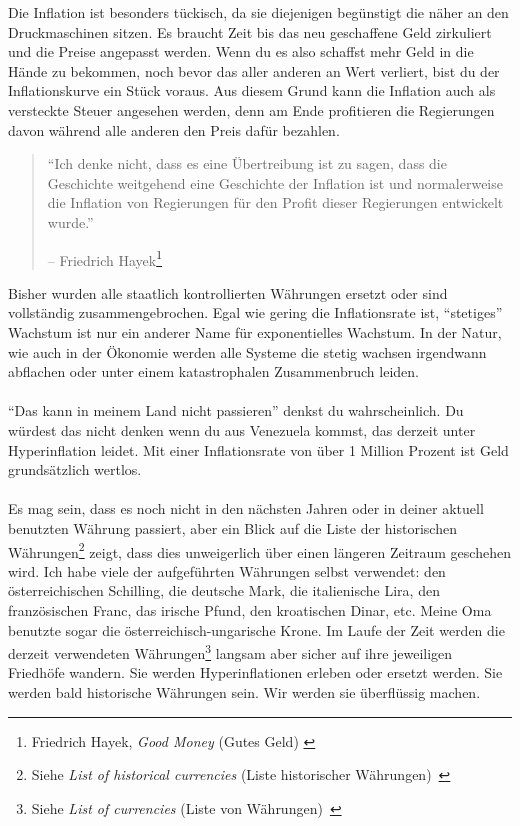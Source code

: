 Die Inflation ist besonders tückisch, da sie diejenigen begünstigt die näher an
den Druckmaschinen sitzen. Es braucht Zeit bis das neu geschaffene Geld
zirkuliert und die Preise angepasst werden. Wenn du es also schaffst mehr Geld
in die Hände zu bekommen, noch bevor das aller anderen an Wert verliert, bist du
der Inflationskurve ein Stück voraus. Aus diesem Grund kann die Inflation auch
als versteckte Steuer angesehen werden, denn am Ende profitieren die Regierungen
davon während alle anderen den Preis dafür bezahlen.

\begin{quotation}\begin{samepage}
\enquote{Ich denke nicht, dass es eine Übertreibung ist zu sagen, dass die
Geschichte weitgehend eine Geschichte der Inflation ist und normalerweise die
Inflation von Regierungen für den Profit dieser Regierungen entwickelt wurde.}
\begin{flushright} -- Friedrich Hayek\footnote{Friedrich Hayek, \textit{Good
Money} (Gutes Geld) \cite{hayek-good-money}}
\end{flushright}\end{samepage}\end{quotation}

Bisher wurden alle staatlich kontrollierten Währungen ersetzt oder sind
vollständig zusammengebrochen. Egal wie gering die Inflationsrate ist,
\enquote{stetiges} Wachstum ist nur ein anderer Name für exponentielles
Wachstum. In der Natur, wie auch in der Ökonomie werden alle Systeme die stetig
wachsen irgendwann abflachen oder unter einem katastrophalen Zusammenbruch
leiden.

\paragraph{}
\enquote{Das kann in meinem Land nicht passieren} denkst du wahrscheinlich. Du
würdest das nicht denken wenn du aus Venezuela kommst, das derzeit unter
Hyperinflation leidet. Mit einer Inflationsrate von über 1 Million Prozent ist
Geld grundsätzlich wertlos. \cite{wiki:venezuela}

\paragraph{}
Es mag sein, dass es noch nicht in den nächsten Jahren oder in deiner aktuell
benutzten Währung passiert, aber ein Blick auf die Liste der historischen
Währungen\footnote{Siehe \textit{List of historical currencies} (Liste
historischer Währungen)~\cite{wiki:historical-currencies}} zeigt,
dass dies unweigerlich über einen längeren Zeitraum geschehen wird. Ich habe
viele der aufgeführten Währungen selbst verwendet: den österreichischen
Schilling, die deutsche Mark, die italienische Lira, den französischen Franc,
das irische Pfund, den kroatischen Dinar, etc. Meine Oma benutzte sogar die
österreichisch-ungarische Krone. Im Laufe der Zeit werden die derzeit
verwendeten Währungen\footnote{Siehe \textit{List of currencies} (Liste von
Währungen)~\cite{wiki:list-of-currencies}} langsam aber sicher auf
ihre jeweiligen Friedhöfe wandern. Sie werden Hyperinflationen erleben oder
ersetzt werden. Sie werden bald historische Währungen sein. Wir werden sie
überflüssig machen.

